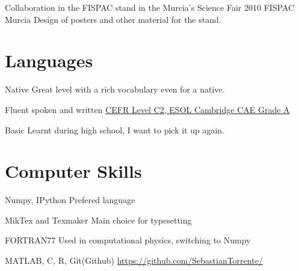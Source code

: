 \documentclass[11pt,a4paper,roman]{moderncv}
\begin{document}
	{Collaboration in the FISPAC stand in the Murcia's Science Fair 2010}
	{FISPAC}
	{Murcia}
	{}
	{Design of posters and other material for the stand.}



\section{Languages}
	{Native}
	{Great level with a rich vocabulary even for a native.}

	{Fluent spoken and written}
	{\href{https://dl.dropbox.com/u/87894135/StatementOfResult.pdf}
	{CEFR Level C2, ESOL Cambridge CAE Grade A}}

	{Basic}
	{Learnt during high school, I want to pick it up again.}


\section{Computer Skills}

	{Numpy, IPython}
	{Prefered language}

\cvitemwithcomment{\LaTeX}
	{MikTex and Texmaker}
	{Main choice for typesetting}

	{FORTRAN77}
	{Used in computational physics, switching to Numpy}


	{MATLAB, C, R, Git(Github)}
	{\href{https://github.com/SebastianTorrente/}
	{https://github.com/SebastianTorrente/}}


\end{document}
